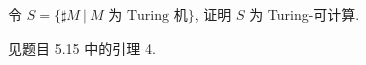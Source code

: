 \begin{problem}
令 $S = \{ \sharp M ~ | ~ M \text{ 为 Turing 机} \}$, 证明 $S$ 为 Turing-可计算.
\end{problem}

\begin{solution}
见题目 5.15 中的引理 4.
\end{solution}
